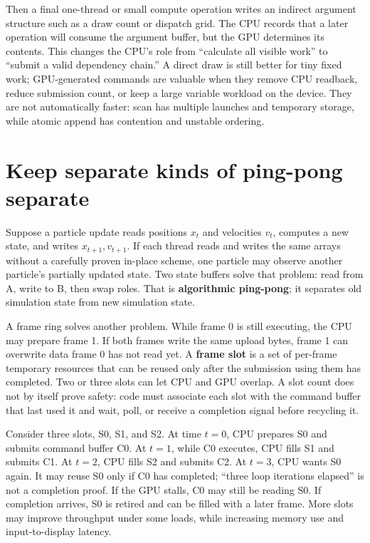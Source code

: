 Then a final one-thread or small compute operation writes an indirect argument structure such as a draw count or dispatch grid. The CPU records that a later operation will consume the argument buffer, but the GPU determines its contents. This changes the CPU's role from ``calculate all visible work'' to ``submit a valid dependency chain.'' A direct draw is still better for tiny fixed work; GPU-generated commands are valuable when they remove CPU readback, reduce submission count, or keep a large variable workload on the device. They are not automatically faster: scan has multiple launches and temporary storage, while atomic append has contention and unstable ordering.

\section{Keep separate kinds of ping-pong separate}\label{01-foundations-i-ch011-keep-separate-kinds-of-ping-pong-separate}

Suppose a particle update reads positions \(x_t\) and velocities \(v_t\), computes a new state, and writes \(x_{t+1},v_{t+1}\). If each thread reads and writes the same arrays without a carefully proven in-place scheme, one particle may observe another particle's partially updated state. Two state buffers solve that problem: read from A, write to B, then swap roles. That is \textbf{algorithmic ping-pong}; it separates old simulation state from new simulation state.

A frame ring solves another problem. While frame 0 is still executing, the CPU may prepare frame 1. If both frames write the same upload bytes, frame 1 can overwrite data frame 0 has not read yet. A \textbf{frame slot} is a set of per-frame temporary resources that can be reused only after the submission using them has completed. Two or three slots can let CPU and GPU overlap. A slot count does not by itself prove safety: code must associate each slot with the command buffer that last used it and wait, poll, or receive a completion signal before recycling it.

Consider three slots, S0, S1, and S2. At time \(t=0\), CPU prepares S0 and submits command buffer C0. At \(t=1\), while C0 executes, CPU fills S1 and submits C1. At \(t=2\), CPU fills S2 and submits C2. At \(t=3\), CPU wants S0 again. It may reuse S0 only if C0 has completed; ``three loop iterations elapsed'' is not a completion proof. If the GPU stalls, C0 may still be reading S0. If completion arrives, S0 is retired and can be filled with a later frame. More slots may improve throughput under some loads, while increasing memory use and input-to-display latency.

